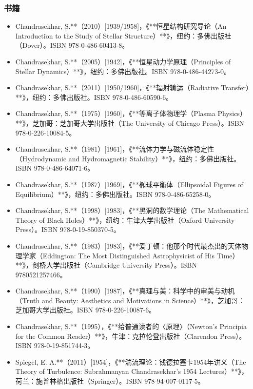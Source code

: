 \subsubsection{书籍}
\begin{itemize}
\item Chandrasekhar, S.**（2010）[1939/1958]，《**恒星结构研究导论（An Introduction to the Study of Stellar Structure）**》，纽约：多佛出版社（Dover）。ISBN 978-0-486-60413-8。
\item Chandrasekhar, S.**（2005）[1942]，《**恒星动力学原理（Principles of Stellar Dynamics）**》，纽约：多佛出版社。ISBN 978-0-486-44273-0。
\item Chandrasekhar, S.**（2011）[1950/1960]，《**辐射输运（Radiative Transfer）**》，纽约：多佛出版社。ISBN 978-0-486-60590-6。
\item Chandrasekhar, S.**（1975）[1960]，《**等离子体物理学（Plasma Physics）**》，芝加哥：芝加哥大学出版社（The University of Chicago Press）。ISBN 978-0-226-10084-5。
\item Chandrasekhar, S.**（1981）[1961]，《**流体力学与磁流体稳定性（Hydrodynamic and Hydromagnetic Stability）**》，纽约：多佛出版社。ISBN 978-0-486-64071-6。
\item Chandrasekhar, S.**（1987）[1969]，《**椭球平衡体（Ellipsoidal Figures of Equilibrium）**》，纽约：多佛出版社。ISBN 978-0-486-65258-0。
\item Chandrasekhar, S.**（1998）[1983]，《**黑洞的数学理论（The Mathematical Theory of Black Holes）**》，纽约：牛津大学出版社（Oxford University Press）。ISBN 978-0-19-850370-5。
\item Chandrasekhar, S.**（1983）[1983]，《**爱丁顿：他那个时代最杰出的天体物理学家（Eddington: The Most Distinguished Astrophysicist of His Time）**》，剑桥大学出版社（Cambridge University Press）。ISBN 9780521257466。
\item Chandrasekhar, S.**（1990）[1987]，《**真理与美：科学中的审美与动机（Truth and Beauty: Aesthetics and Motivations in Science）**》，芝加哥：芝加哥大学出版社。ISBN 978-0-226-10087-6。
\item Chandrasekhar, S.**（1995），《**给普通读者的〈原理〉（Newton's Principia for the Common Reader）**》，牛津：克拉伦登出版社（Clarendon Press）。ISBN 978-0-19-851744-3。
\item Spiegel, E. A.**（2011）[1954]，《**湍流理论：钱德拉塞卡1954年讲义（The Theory of Turbulence: Subrahmanyan Chandrasekhar’s 1954 Lectures）**》，荷兰：施普林格出版社（Springer）。ISBN 978-94-007-0117-5。
\end{itemize}
